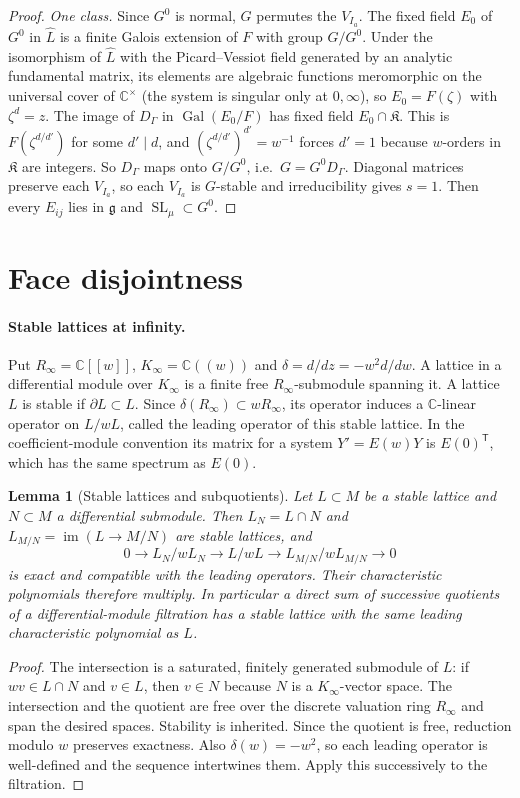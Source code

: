\documentclass[11pt]{article}
\numberwithin{equation}{section}
\newtheorem{lemma}[lemma]{Lemma}
\theoremstyle{definition}
\theoremstyle{remark}
\newcommand{\C}{\mathbb C}
\newcommand{\Gal}{\operatorname{Gal}}
\newcommand{\SL}{\operatorname{SL}}
\begin{document}
\begin{proof}
\emph{One class.} Since $G^0$ is normal, $G$ permutes the $V_{I_a}$. The fixed
field $E_0$ of $G^0$ in $\widehat L$ is a finite Galois extension of $F$ with
group $G/G^0$. Under the isomorphism of $\widehat L$ with the Picard--Vessiot
field generated by an analytic fundamental matrix, its elements are algebraic
functions meromorphic on the universal cover of $\C^\times$ (the system is
singular only at $0,\infty$), so $E_0=F(\zeta)$ with $\zeta^d=z$. The image of
$D_\Gamma$ in $\Gal(E_0/F)$ has fixed field $E_0\cap\mathfrak K$. This is
$F(\zeta^{d/d'})$ for some $d'\mid d$, and
$(\zeta^{d/d'})^{d'}=w^{-1}$ forces $d'=1$ because $w$-orders in $\mathfrak K$
are integers. So $D_\Gamma$ maps onto $G/G^0$, i.e.\ $G=G^0D_\Gamma$. Diagonal
matrices preserve each $V_{I_a}$, so each $V_{I_a}$ is $G$-stable and
irreducibility gives $s=1$. Then every $E_{ij}$ lies in $\mathfrak g$ and
$\SL_\mu\subset G^0$.
\end{proof}

\section{Face disjointness}

\paragraph{Stable lattices at infinity.}
Put $R_\infty=\C[[w]]$, $K_\infty=\C((w))$ and
$\delta=d/dz=-w^2d/dw$. A lattice in a differential module over $K_\infty$
is a finite free $R_\infty$-submodule spanning it. A lattice $L$ is stable if
$\partial L\subset L$. Since $\delta(R_\infty)\subset wR_\infty$, its
operator induces a $\C$-linear operator on $L/wL$, called the leading
operator of this stable lattice. In the coefficient-module convention its
matrix for a system $Y'=E(w)Y$ is $E(0)^{\mathsf T}$, which has the same
spectrum as $E(0)$.

\begin{lemma}[Stable lattices and subquotients]\label{lem:lattice}
Let $L\subset M$ be a stable lattice and $N\subset M$ a differential
submodule. Then $L_N=L\cap N$ and $L_{M/N}=\operatorname{im}(L\to M/N)$
are stable lattices, and
\[
 0\longrightarrow L_N/wL_N\longrightarrow L/wL
 \longrightarrow L_{M/N}/wL_{M/N}\longrightarrow0
\]
is exact and compatible with the leading operators. Their characteristic
polynomials therefore multiply. In particular a direct sum of successive
quotients of a differential-module filtration has a stable lattice with the
same leading characteristic polynomial as $L$.
\end{lemma}
\begin{proof}
The intersection is a saturated, finitely generated submodule of $L$:
if $wv\in L\cap N$ and $v\in L$, then $v\in N$ because $N$ is a
$K_\infty$-vector space. The intersection and the quotient are free over the
discrete valuation ring $R_\infty$ and span the desired spaces. Stability
is inherited. Since the quotient is free, reduction modulo $w$ preserves
exactness. Also $\delta(w)=-w^2$, so each leading operator is well-defined
and the sequence intertwines them. Apply this successively to the filtration.
\end{proof}
\end{document}
